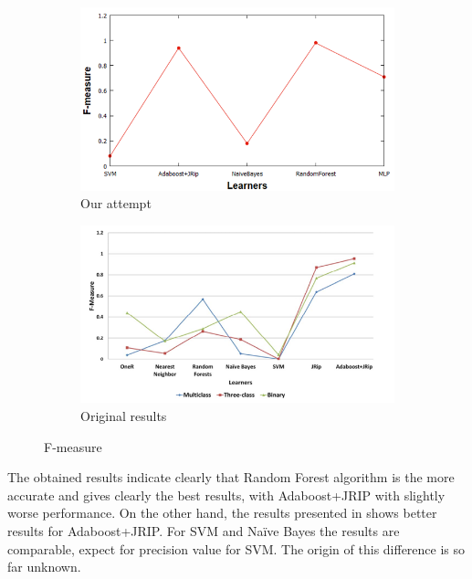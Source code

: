 \begin{figure}[H]
    \centering
    \begin{subfigure}[t]{0.5\textwidth}
        \includegraphics[width=\linewidth]{images/weka_f1.png}
        \caption{Our attempt}
    \end{subfigure}%
    \begin{subfigure}[t]{0.5\textwidth}
        \includegraphics[width=\linewidth]{images/weka_f1_cite.png}
        \caption{Original results \cite{borges_hink_machine_2014-1}}
    \end{subfigure}
    \caption{F-measure}
    \label{fig:weka_f1}
\end{figure}

The obtained results indicate clearly that Random Forest algorithm is the more accurate and gives clearly the best results, with Adaboost+JRIP with slightly worse performance. On the other hand, the results presented in \cite{borges_hink_machine_2014-1} shows better results for Adaboost+JRIP. For SVM and Naïve Bayes the results are comparable, expect for precision value for SVM. The origin of this difference is so far unknown.

